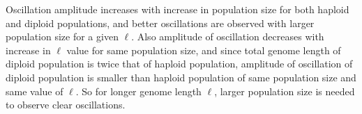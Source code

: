 Oscillation amplitude increases with increase in population size for both haploid and diploid populations, 
and better oscillations are observed with larger population size for a given $\ell$. 
Also amplitude of oscillation decreases with increase in $\ell$ value for same population size, 
and since total genome length of diploid population is twice that of haploid population, 
amplitude of oscillation of diploid population is smaller than haploid population of same population size and same value of $\ell$. 
So for longer genome length $\ell$, larger population size is needed to observe clear oscillations.

\begin{figure}[h]
\begin{center}
 \vspace{-0.5em} 


\end{center}
\end{figure}
